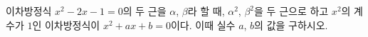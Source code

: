 이차방정식 $x^2-2x-1=0$의 두 근을 $\alpha$, $\beta$라 할 때, $\alpha^2$, $\beta^2$을 두 근으로 하고 $x^2$의 계수가 $1$인 이차방정식이 $x^2+ax+b=0$이다. 이때 실수 $a$, $b$의 값을 구하시오.

